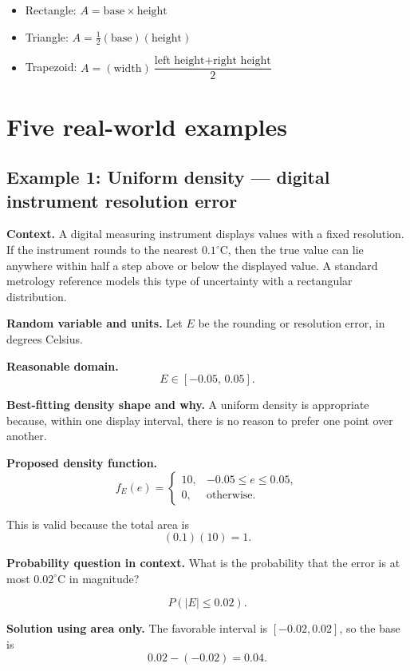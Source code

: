 \documentclass[11pt]{article}
\begin{document}
	\begin{itemize}[leftmargin=*]
		\item Rectangle: $A=\text{base}\times \text{height}$
		\item Triangle: $A=\frac12(\text{base})(\text{height})$
		\item Trapezoid: $A=(\text{width})\dfrac{\text{left height}+\text{right height}}{2}$
	\end{itemize}
	
	\section{Five real-world examples}
	
	\subsection{Example 1: Uniform density --- digital instrument resolution error}
	
	\textbf{Context.} A digital measuring instrument displays values with a fixed resolution. If the instrument rounds to the nearest $0.1^\circ\text{C}$, then the true value can lie anywhere within half a step above or below the displayed value. A standard metrology reference models this type of uncertainty with a rectangular distribution.
	
	\textbf{Random variable and units.} Let $E$ be the rounding or resolution error, in degrees Celsius.
	
	\textbf{Reasonable domain.}
	\[
	E\in[-0.05,\,0.05].
	\]
	
	\textbf{Best-fitting density shape and why.} A uniform density is appropriate because, within one display interval, there is no reason to prefer one point over another.
	
	\textbf{Proposed density function.}
	\[
	f_E(e)=
	\begin{cases}
		10, & -0.05\le e\le 0.05,\\
		0, & \text{otherwise}.
	\end{cases}
	\]
	
	This is valid because the total area is
	\[
	(0.1)(10)=1.
	\]
	
	\textbf{Probability question in context.} What is the probability that the error is at most $0.02^\circ\text{C}$ in magnitude?
	
	\[
	P(|E|\le 0.02).
	\]
	
	\textbf{Solution using area only.} The favorable interval is $[-0.02,0.02]$, so the base is
	\[
	0.02-(-0.02)=0.04.
	\]
	
\end{document}
